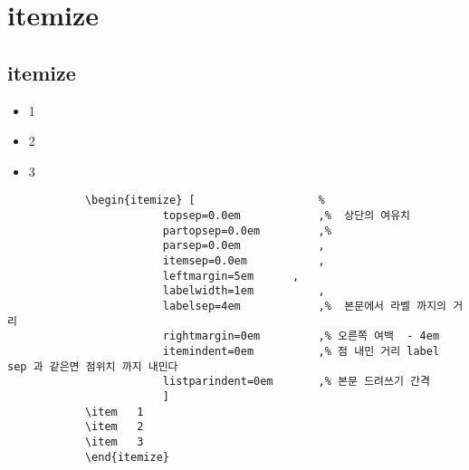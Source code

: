 	

	


	\chapter{itemize}


	\section{itemize}

			\begin{itemize}	[					%
						topsep=0.0em 			,%
						partopsep=0.0em 		,%
						parsep=0.0em 			, 
						itemsep=0.0em 			, 
						leftmargin=5em 		,
						labelwidth=1em 			, 
						labelsep=4em 			,%
						rightmargin=0em 		,%
						itemindent=0em 			,%
						listparindent=0em 		,%
						]
			\item	1
			\item	2
			\item	3
			\end{itemize}

		\begin{mdframed}[style=code_document, frametitle={code}]
			\begin{verbatim}
			\begin{itemize}	[					%
						topsep=0.0em 			,%  상단의 여유치
						partopsep=0.0em 		,%  
						parsep=0.0em 			, 
						itemsep=0.0em 			, 
						leftmargin=5em 		,
						labelwidth=1em 			, 
						labelsep=4em 			,%  본문에서 라벨 까지의 거리
						rightmargin=0em 		,% 오른쪽 여백  - 4em
						itemindent=0em 			,% 점 내민 거리 label sep 과 같은면 점위치 까지 내민다
						listparindent=0em 		,% 본문 드려쓰기 간격
						]
			\item	1
			\item	2
			\item	3
			\end{itemize}
			\end{verbatim}
		\end{mdframed}



